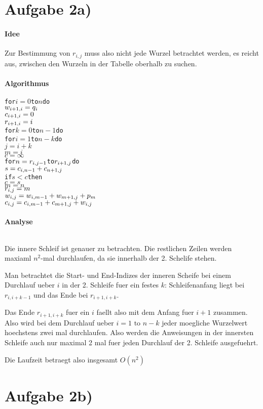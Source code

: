 \section*{Aufgabe 2a)}
\paragraph{Idee}
Zur Bestimmung von $r_{i,j}$ muss also nicht jede Wurzel betrachtet werden, es reicht aus,
zwischen den Wurzeln in der Tabelle oberhalb zu suchen.

\paragraph{Algorithmus}
\begin{alltt}
for \(i=0\) to \(n\) do
  \(w\sb{i+1,i} = q\sb{i}\)
  \(c\sb{i+1,i} = 0  \)
  \(r\sb{i+1,i} = i \)
for \(k=0\) to \(n-1\) do
  for \(i=1\) to \(n-k\) do
    \(j = i+k\)
    \(m = i\)
    \(c = \infty\)
    for \(n = r\sb{i,j-1}\) to \(r\sb{i+1,j}\) do
      \(s = c\sb{i,n-1} + c\sb{n+1,j}\)
      if \(s < c\) then
        \(c = s\)
        \(m = n\)
    \(r\sb{i,j} = m\)
    \(w\sb{i,j} = w\sb{i,m-1} + w\sb{m+1,j} + p\sb{m}\)
    \(c\sb{i,j} = c\sb{i,m-1} + c\sb{m+1,j} + w\sb{i,j}\)
\end{alltt}

\paragraph{Analyse} $ $

Die innere Schleif ist genauer zu betrachten. Die restlichen Zeilen
werden maxiaml $n^2$-mal durchlaufen, da sie innerhalb der 2. Schelife stehen.

Man betrachtet die Start- und End-Indizes der inneren Scheife bei einem Durchlauf
ueber $i$ in der 2. Schleife fuer ein festes $k$: Schleifenanfang liegt bei $r_{i,i+k-1}$ und das Ende bei $r_{i+1,i+k}$.

Das Ende $r_{i+1,i+k}$ fuer ein $i$ faellt also mit dem Anfang fuer $i+1$ zusammen.
Also wird bei dem Durchlauf ueber $i = 1 \text{ to } n-k$ jeder moegliche Wurzelwert 
hoechstens zwei mal durchlaufen.
Also werden die Anweisungen in der innersten Schleife auch nur maximal 2 mal
fuer jeden Durchlauf der 2. Schleife ausgefuehrt.

Die Laufzeit betraegt also insgesamt $O(n^2)$
\section*{Aufgabe 2b)}

